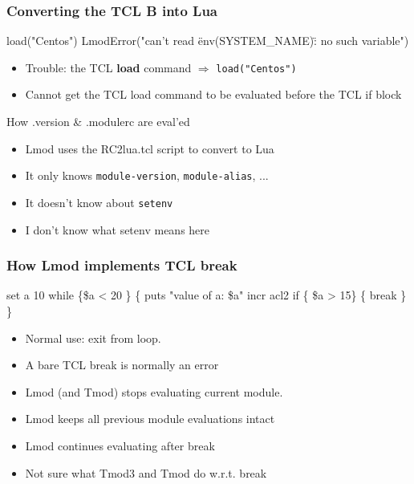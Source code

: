 \documentclass{beamer}
\begin{document}
\begin{frame}[fragile]
    \frametitle{Converting the TCL \textbf{B} into Lua}
 {\tiny
    \begin{semiverbatim}
   load("Centos")
   LmodError("can't read \"env(SYSTEM\_NAME)\": no such variable")
    \end{semiverbatim}
}
  \begin{itemize}
    \item Trouble: the TCL \textbf{load} command $\Rightarrow$
      \texttt{load("Centos")}
    \item Cannot get the TCL load command to be evaluated before the
      TCL if block
  \end{itemize}

\end{frame}

\begin{frame}{How .version \& .modulerc are eval'ed}
  \begin{itemize}
    \item Lmod uses the RC2lua.tcl script to convert to Lua
    \item It only knows \texttt{module-version},
      \texttt{module-alias}, ...
    \item It doesn't know about \texttt{setenv}
    \item I don't know what setenv means here
  \end{itemize}
\end{frame}

\begin{frame}[fragile]
    \frametitle{How Lmod implements TCL break}
 {\tiny
    \begin{semiverbatim}
    set a 10
    while \{\$a < 20 \} \{
       puts "value of a: \$a"
       incr acl2
       if \{ \$a > 15\} \{
          break
       \}
    \}
    \end{semiverbatim}
}
  \begin{itemize}
    \item Normal use: exit from loop.
    \item A bare TCL break is normally an error
    \item Lmod (and Tmod) stops evaluating current module.
    \item Lmod keeps all previous module evaluations intact
    \item Lmod continues evaluating after break
    \item Not sure what Tmod3 and Tmod do w.r.t. break
  \end{itemize}
\end{frame}
\end{document}
